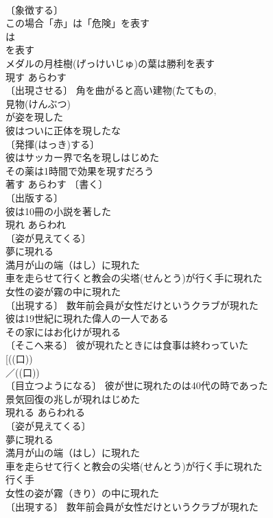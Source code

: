 \documentclass[8pt]{extreport}
\begin{document}
\begin{CJK}{UTF8}{min}
\\	〔象徴する〕
\\	この場合「赤」は「危険」を表す 
\\	は
\\	を表す 
\\	メダルの月桂樹(げっけいじゅ)の葉は勝利を表す 
\\	現す	あらわす	
\\	〔出現させる〕 角を曲がると高い建物(たてもの, 
\\	見物(けんぶつ)
\\	が姿を現した 
\\	彼はついに正体を現したな 
\\	〔発揮(はっき)する〕
\\	彼はサッカー界で名を現しはじめた 
\\	その薬は1時間で効果を現すだろう 
\\	著す	あらわす	〔書く〕
\\	〔出版する〕
\\	彼は10冊の小説を著した 
\\	現れ	あらわれ	
\\	〔姿が見えてくる〕
\\	夢に現れる 
\\	満月が山の端（はし）に現れた 
\\	車を走らせて行くと教会の尖塔(せんとう)が行く手に現れた 
\\	女性の姿が霧の中に現れた 
\\	〔出現する〕 数年前会員が女性だけというクラブが現れた 
\\	彼は19世紀に現れた偉人の一人である 
\\	その家にはお化けが現れる 
\\	〔そこへ来る〕 彼が現れたときには食事は終わっていた 
\\	[((口))
\\	／((口))
\\	〔目立つようになる〕 彼が世に現れたのは40代の時であった 
\\	景気回復の兆しが現れはじめた 
\\	現れる	あらわれる	
\\	〔姿が見えてくる〕
\\	夢に現れる 
\\	満月が山の端（はし）に現れた 
\\	車を走らせて行くと教会の尖塔(せんとう)が行く手に現れた 
\\	行く手　
\\	女性の姿が霧（きり）の中に現れた 
\\	〔出現する〕 数年前会員が女性だけというクラブが現れた 

\end{CJK}
\end{document}
